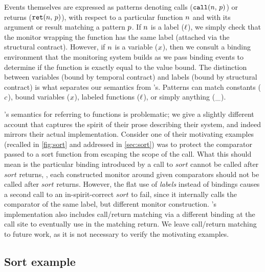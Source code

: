 \documentclass[preprint,onecolumn,9pt]{sigplanconf} %
\begin{document}
Events themselves are expressed as patterns denoting calls (${\tt call}(n,\, p)$) or returns (${\tt ret}(n,\, p)$), with respect to a particular function $n$ and with its argument or result matching a pattern $p$.
%
If $n$ is a label ($\ell$), we simply check that the monitor wrapping the function has the same label (attached via the structural contract).
%
However, if $n$ is a variable ($x$), then we consult a binding environment that the monitoring system builds as we pass binding events to determine if the function is exactly equal to the value bound.
%
The distinction between variables (bound by temporal contract) and labels (bound by structural contract) is what separates our semantics from \citeauthor{ianjohnson:dfm:icfp2011}'s.
%
Patterns can match constants ($c$), bound variables ($x$), labeled functions ($\ell$), or simply anything ($\_$).

\citeauthor{ianjohnson:dfm:icfp2011}'s semantics for referring to functions is problematic; we give a slightly different account that captures the spirit of their prose describing their system, and indeed mirrors their actual implementation.
%
Consider one of their motivating examples (recalled in \autoref{fig:sort} and addressed in \autoref{sec:sort}) was to protect the comparator passed to a sort function from escaping the scope of the call.
%
What this should mean is the particular binding introduced by a call to $sort$ cannot be called after $sort$ returns, \ie, each constructed monitor around given comparators should not be called after $sort$ returns.
%
However, the flat use of \emph{labels} instead of bindings causes a second call to an in-spirit-correct $sort$ to fail, since it internally calls the comparator of the same label, but different monitor construction.
%
\citeauthor{ianjohnson:dfm:icfp2011}'s implementation also includes call/return matching via a different binding at the call site to eventually use in the matching return.
%
We leave call/return matching to future work, as it is not necessary to verify the motivating examples.

\subsection{Sort example} \label{sec:sort}
\end{document}
